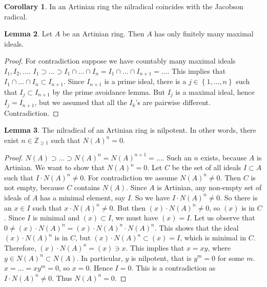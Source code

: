 \documentclass{article}
\newcommand{\Z}{\mathbb{Z}}
\newcommand{\rb}[1]{\left( #1 \right)}
\newcommand{\cb}[1]{\left\{ #1 \right\}}
\theoremstyle{definition}\newtheorem{definition}{Definition}[section]
\theoremstyle{definition}\newtheorem{remark}[definition]{Remark}
\theoremstyle{definition}\newtheorem*{example}{Example}
\theoremstyle{definition}\newtheorem*{note}{Note}
\newtheorem{lemma}[definition]{Lemma}
\newtheorem{corollary}[definition]{Corollary}
\begin{document}
\begin{corollary}
\label{cor:12.8}
In an Artinian ring the nilradical coincides with the Jacobson radical.
\end{corollary}

\begin{lemma}
\label{lem:12.9}
Let $ A $ be an Artinian ring. Then $ A $ has only finitely many maximal ideals.
\end{lemma}

\begin{proof}
For contradiction suppose we have countably many maximal ideals $ I_1, I_2, \dots $. $ I_1 \supset \dots \supset I_1 \cap \dots \cap I_n = I_1 \cap \dots \cap I_{n + 1} = \dots $. This implies that $ I_1 \cap \dots \cap I_n \subset I_{n + 1} $. Since $ I_{n + 1} $ is a prime ideal, there is a $ j \in \cb{1, \dots, n} $ such that $ I_j \subset I_{n + 1} $ by the prime avoidance lemma. But $ I_j $ is a maximal ideal, hence $ I_j = I_{n + 1} $, but we assumed that all the $ I_k $'s are pairwise different. Contradiction.
\end{proof}

\begin{lemma}
\label{lem:12.10}
The nilradical of an Artinian ring is nilpotent. In other words, there exist $ n \in \Z_{\ge 1} $ such that $ N\rb{A}^n = 0 $.
\end{lemma}

\begin{proof}
$ N\rb{A} \supset \dots \supset N\rb{A}^n = N\rb{A}^{n + 1} = \dots $. Such an $ n $ exists, because $ A $ is Artinian. We want to show that $ N\rb{A}^n = 0 $. Let $ C $ be the set of all ideals $ I \subset A $ such that $ I \cdot N\rb{A}^n \ne 0 $. For contradiction we assume $ N\rb{A}^n \ne 0 $. Then $ C $ is not empty, because $ C $ contains $ N\rb{A} $. Since $ A $ is Artinian, any non-empty set of ideals of $ A $ has a minimal element, say $ I $. So we have $ I \cdot N\rb{A}^n \ne 0 $. So there is an $ x \in I $ such that $ x \cdot N\rb{A}^n \ne 0 $. But then $ \rb{x} \cdot N\rb{A}^n \ne 0 $, so $ \rb{x} $ is in $ C $. Since $ I $ is minimal and $ \rb{x} \subset I $, we must have $ \rb{x} = I $. Let us observe that $ 0 \ne \rb{x} \cdot N\rb{A}^n = \rb{x} \cdot N\rb{A}^n \cdot N\rb{A}^n $. This shows that the ideal $ \rb{x} \cdot N\rb{A}^n $ is in $ C $, but $ \rb{x} \cdot N\rb{A}^n \subset \rb{x} = I $, which is minimal in $ C $. Therefore, $ \rb{x} \cdot N\rb{A}^n = \rb{x} \ni x $. This implies that $ x = xy $, where $ y \in N\rb{A}^n \subset N\rb{A} $. In particular, $ y $ is nilpotent, that is $ y^m = 0 $ for some $ m $. $ x = \dots = xy^m = 0 $, so $ x = 0 $. Hence $ I = 0 $. This is a contradiction as $ I \cdot N\rb{A}^n \ne 0 $. Thus $ N\rb{A}^n = 0 $.
\end{proof}
\end{document}
